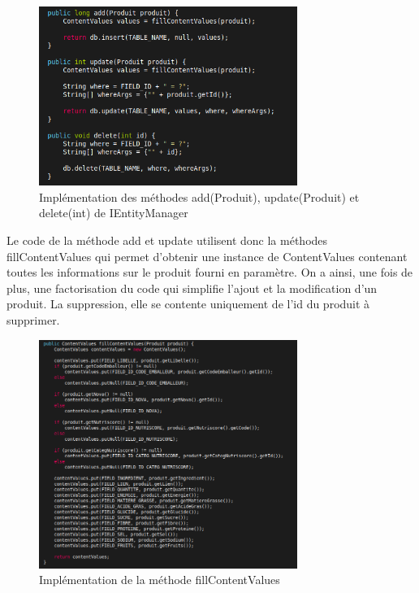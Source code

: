 \documentclass[report]{BetterDocument}
\begin{document}
			\begin{figure}[H]
				\centering\includegraphics[width=0.75\textwidth, keepaspectratio]{img/bdd/dao_methodes_add_update_delete.png}
				\caption{Implémentation des méthodes add(Produit), update(Produit) et delete(int) de IEntityManager}
			\end{figure}

			Le code de la méthode add et update utilisent donc la méthodes fillContentValues qui permet d'obtenir une instance de ContentValues contenant toutes les informations sur le produit fourni en paramètre. On a ainsi, une fois de plus, une factorisation du code qui simplifie l'ajout et la modification d'un produit. La suppression, elle se contente uniquement de l'id du produit à supprimer.

			\begin{figure}[H]
				\centering\includegraphics[width=0.75\textwidth, keepaspectratio]{img/bdd/dao_methodes_fillcontentvalues.png}
				\caption{Implémentation de la méthode fillContentValues}
			\end{figure}
\end{document}
